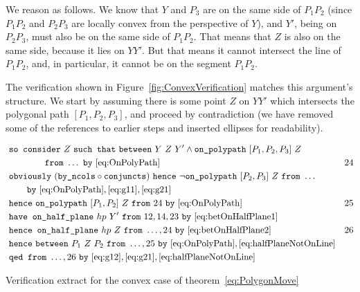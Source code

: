 We reason as follows. We know that $Y$ and $P_3$ are on the same side of $P_1P_2$ (since $P_1P_2$ and $P_2P_3$ are locally convex from the perspective of $Y$), and $Y'$, being on $P_2P_3$, must also be on the same side of $P_1P_2$. That means that $Z$ is also on the same side, because it lies on $YY'$. But that means it cannot intersect the line of $P_1P_2$, and, in particular, it cannot be on the segment $P_1P_2$.

The verification shown in Figure~\ref{fig:ConvexVerification} matches this argument's structure.  We start by assuming there is some point $Z$ on $YY'$ which intersects the polygonal path $[P_1,P_2,P_3]$, and proceed by contradiction (we have removed some of the references to earlier steps and inserted ellipses for readability). 

\begin{boxedfigure}
\small
\begin{align*}
&\code{so consider}\ Z\ \code{such that}\ \between{Y}{Z}{Y'} \wedge \code{on\_polypath}\ [P_1,P_2,P_3]\ Z\\\
&\qquad\qquad\code{from}\ \ldots\ \code{by}\ \eqref{eq:OnPolyPath} & 24\\
&\code{obviously}\ (\code{by\_ncols}\circ\code{conjuncts})\ \code{hence}\ \neg\code{on\_polypath}\ [P_2,P_3]\ Z\ \code{from}\ \ldots\\
&\qquad\code{by}\ \eqref{eq:OnPolyPath},\eqref{eq:g11},\eqref{eq:g21}\\
&\code{hence}\ \code{on\_polypath}\ [P_1,P_2]\ Z\ \code{from}\ 24\ \code{by}\ \eqref{eq:OnPolyPath}&25\\
&\code{have on\_half\_plane}\ hp\ Y'\ \code{from}\ 12,14,23\ \code{by}\ \eqref{eq:betOnHalfPlane1}\\
&\code{hence on\_half\_plane}\ hp\ Z\ \code{from}\ \ldots,24\ \code{by}\ \eqref{eq:betOnHalfPlane2} & 26\\
&\code{hence}\ \between{P_1}{Z}{P_2}\ \code{from}\ \ldots,25\ \code{by}\ \eqref{eq:OnPolyPath},\eqref{eq:halfPlaneNotOnLine}\\
&\code{qed from}\ \ldots,26\ \code{by}\ \eqref{eq:g12},\eqref{eq:g21},\eqref{eq:halfPlaneNotOnLine}
\end{align*}
\caption{Verification extract for the convex case of theorem~\ref{eq:PolygonMove}}
\label{fig:ConvexVerification}
\end{boxedfigure}

